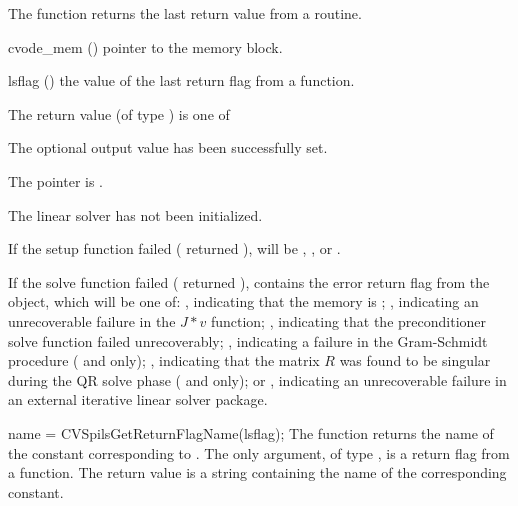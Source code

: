 {
  The function  returns the
  last return value from a {\cvspils} routine. 
}
{
  \begin{args}
  \item[cvode\_mem] ()
    pointer to the {\cvode} memory block.
  \item[lsflag] ()
    the value of the last return flag from a {\cvspils} function.
  \end{args}
}
{
  The return value  (of type ) is one of
  \begin{args}
  \item[\Id{CVSPILS\_SUCCESS}] 
    The optional output value has been successfully set.
  \item[\Id{CVSPILS\_MEM\_NULL}]
    The  pointer is .
  \item[\Id{CVSPILS\_LMEM\_NULL}]
    The {\cvspils} linear solver has not been initialized.
  \end{args}
}
{
  If the {\cvspils} setup function failed ( returned
  ),  will be ,
  , or .

  If the {\cvspils} solve function failed ( returned
  ),  contains the error return flag from
  the {\sunlinsol} object, which will be one of:
  , indicating that the {\sunlinsol} memory is ;
  , indicating an unrecoverable failure in the 
  $J*v$ function;
  , indicating that the preconditioner solve
  function  failed unrecoverably;
  , indicating a failure in the Gram-Schmidt
  procedure ({\spgmr} and {\spfgmr} only); 
  , indicating that the matrix $R$ was found to be
  singular during the QR solve phase ({\spgmr} and {\spfgmr} only); or
  , indicating an unrecoverable
  failure in an external iterative linear solver package.
}
{
  name = CVSpilsGetReturnFlagName(lsflag);
}
{
  The function  returns the
  name of the {\cvspils} constant corresponding to .
}
{
  The only argument, of type , is a return flag from a {\cvspils} function.
}
{
  The return value is a string containing the name of the corresponding constant.
}
{}


